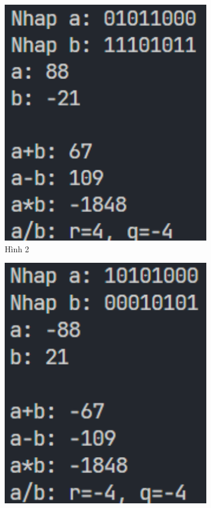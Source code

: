 \documentclass[a4paper,12pt]{report}
\begin{document}
\begin{figure}[!ht]
\begin{subfigure}{0.36\textwidth}
		\includegraphics[width=1\textwidth]{imgs/2-2.png}
		\caption{Hình 2}
	\end{subfigure}
	\hfill
	\begin{subfigure}{0.36\textwidth}
		\centering
		\includegraphics[width=1\textwidth]{imgs/2-3.png}

\end{subfigure}
\end{figure}
\end{document}
